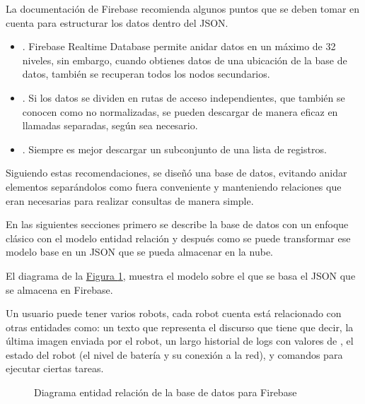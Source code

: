 La documentación de Firebase recomienda algunos puntos que se deben tomar
en cuenta para estructurar los datos dentro del JSON.
\begin{itemize}
\item {} 
. Firebase Realtime Database permite anidar datos en un máximo de 32 niveles, sin embargo, cuando obtienes datos de una ubicación de la base de datos, también se recuperan todos los nodos secundarios.

\item {} 
. Si los datos se dividen en rutas de acceso independientes, que también se conocen como no normalizadas, se pueden descargar de manera eficaz en llamadas separadas, según sea necesario.

\item {} 
. Siempre es mejor descargar un subconjunto de una lista de registros.

\end{itemize}

Siguiendo estas recomendaciones, se diseñó una base de datos, evitando anidar
elementos separándolos como fuera conveniente y manteniendo relaciones que
eran necesarias para realizar consultas de manera simple.

En las siguientes secciones primero se describe la base de datos con un enfoque
clásico con el modelo entidad relación y después como se puede transformar ese
modelo base en un JSON que se pueda almacenar en la nube.

El diagrama de la \hyperref[\detokenize{chapter_two/desc_cloudnao:entity-relationship-model-cn-firebase}]{Figura \ref{\detokenize{chapter_two/desc_cloudnao:entity-relationship-model-cn-firebase}}}, muestra el
modelo sobre el que se basa el JSON que se almacena en Firebase.

Un usuario puede tener varios robots, cada robot cuenta está relacionado
con otras entidades como: un texto que representa el discurso que tiene que decir,
la última imagen enviada por el robot, un largo historial de
logs con valores de , el estado del robot (el nivel de batería y
su conexión a la red), y comandos para ejecutar ciertas tareas.

\begin{figure}[htbp]
\centering
\capstart

\noindent{}
\caption{Diagrama entidad relación de la base de datos para Firebase}\label{\detokenize{chapter_two/desc_cloudnao:entity-relationship-model-cn-firebase}}\end{figure}


